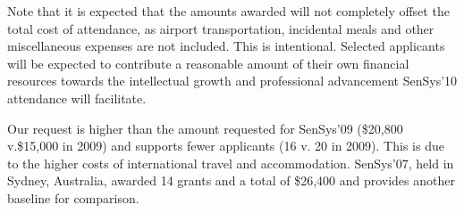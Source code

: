 Note that it is expected that the amounts awarded will not completely offset
the total cost of attendance, as airport transportation, incidental meals and
other miscellaneous expenses are not included. This is intentional. Selected
applicants will be expected to contribute a reasonable amount of their own
financial resources towards the intellectual growth and professional
advancement SenSys'10 attendance will facilitate.

Our request is higher than the amount requested for SenSys'09 (\$20,800
v.\$15,000 in 2009) and supports fewer applicants (16 v. 20 in 2009). This is
due to the higher costs of international travel and accommodation. SenSys'07,
held in Sydney, Australia, awarded 14 grants and a total of \$26,400 and
provides another baseline for comparison.
